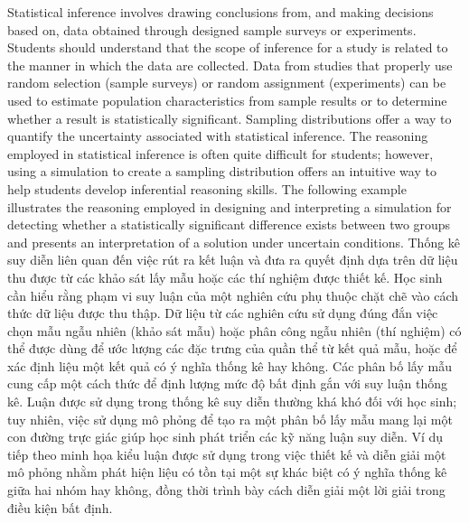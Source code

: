 \documentclass[
  10pt,
  a4paper,
  landscape,
  twoside,
  openany
]{scrbook}
\newcommand{\EN}[1]{#1}
\newcommand{\VI}[1]{#1}
\newcounter{example}
\begin{document}
\TriPara
{
\EN{Statistical inference involves drawing conclusions from, and making decisions based on, data obtained through designed sample surveys or experiments. Students should understand that the scope of inference for a study is related to the manner in which the data are collected. Data from studies that properly use random selection (sample surveys) or random assignment (experiments) can be used to estimate population characteristics from sample results or to determine whether a result is statistically significant. Sampling distributions offer a way to quantify the uncertainty associated with statistical inference. The reasoning employed in statistical inference is often quite difficult for students; however, using a simulation to create a sampling distribution offers an intuitive way to help students develop inferential reasoning skills. The following example illustrates the reasoning employed in designing and interpreting a simulation for detecting whether a statistically significant difference exists between two groups and presents an interpretation of a solution under uncertain conditions.}
}
{
\VI{Thống kê suy diễn liên quan đến việc rút ra kết luận và đưa ra quyết định dựa trên dữ liệu thu được từ các khảo sát lấy mẫu hoặc các thí nghiệm được thiết kế. Học sinh cần hiểu rằng phạm vi suy luận của một nghiên cứu phụ thuộc chặt chẽ vào cách thức dữ liệu được thu thập. Dữ liệu từ các nghiên cứu sử dụng đúng đắn việc chọn mẫu ngẫu nhiên (khảo sát mẫu) hoặc phân công ngẫu nhiên (thí nghiệm) có thể được dùng để ước lượng các đặc trưng của quần thể từ kết quả mẫu, hoặc để xác định liệu một kết quả có ý nghĩa thống kê hay không. Các phân bố lấy mẫu cung cấp một cách thức để định lượng mức độ bất định gắn với suy luận thống kê. Luận được sử dụng trong thống kê suy diễn thường khá khó đối với học sinh; tuy nhiên, việc sử dụng mô phỏng để tạo ra một phân bố lấy mẫu mang lại một con đường trực giác giúp học sinh phát triển các kỹ năng luận suy diễn. Ví dụ tiếp theo minh họa kiểu luận được sử dụng trong việc thiết kế và diễn giải một mô phỏng nhằm phát hiện liệu có tồn tại một sự khác biệt có ý nghĩa thống kê giữa hai nhóm hay không, đồng thời trình bày cách diễn giải một lời giải trong điều kiện bất định.}
}
\end{document}
